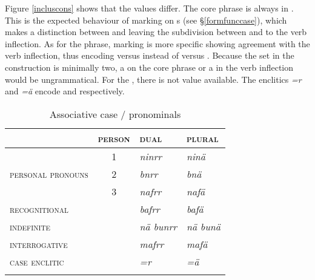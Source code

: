 Figure \ref{incluscons} shows that the  values differ. The core phrase is always in . This is the expected behaviour of  marking on s (see \S\ref{formfunccase}), which makes a distinction between  and  leaving the subdivision between  and  to the verb inflection. As for the  phrase,  marking is more specific showing agreement with the verb inflection, thus encoding  versus  instead of  versus . Because the set in the  construction is minimally two, a  on the core phrase or a  in the verb inflection would be ungrammatical. For the  , there is not   value available. The enclitics \emph{=r} and \emph{=ä} encode  and  respectively.

\begin{table}
\caption{Associative case / pronominals}
\label{comcase-table}
	\begin{tabular}{p{3cm}cll}
		\lsptoprule
		& \textsc{person} &\textsc{dual} &\textsc{plural} \\\midrule
		\multirow{3}{3cm}{\textsc{personal pronouns}} &1 &\emph{ninrr} &\emph{ninä}\\
		&2 &\emph{bnrr} &\emph{bnä}\\
		&3 &\emph{nafrr} &\emph{nafä}\\
		\textsc{recognitional}&&\emph{bafrr}&\emph{bafä}\\
		\textsc{indefinite}&&\emph{nä bunrr}&\emph{nä bunä}\\
		\textsc{interrogative}&&\emph{mafrr}&\emph{mafä}\\
		\textsc{case enclitic}&&\emph{=r}&\emph{=ä}\\
		\lspbottomrule
	\end{tabular}
\end{table}%

